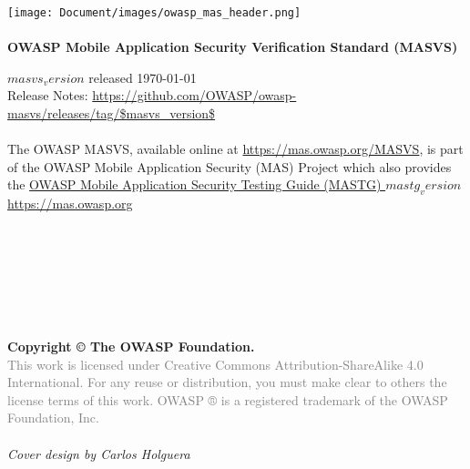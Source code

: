 \thispagestyle{empty} %

\texttt{[image: Document/images/owasp\_mas\_header.png]} \\ \\

\large{\textbf{OWASP Mobile Application Security Verification Standard (MASVS)} }

$masvs_version$ released \today \\

Release Notes: \url{https://github.com/OWASP/owasp-masvs/releases/tag/$masvs_version$} \\ \\


The OWASP MASVS, available online at \url{https://mas.owasp.org/MASVS}, is part of the OWASP Mobile Application Security (MAS) Project which also provides the \href{https://mas.owasp.org/MASTG}{OWASP Mobile Application Security Testing Guide (MASTG) $mastg_version$} \\

\url{https://mas.owasp.org} \\ \\ \\ \\ \\ \\ \\ \\

\textbf{Copyright © The OWASP Foundation.} \\

\footnotesize{\textcolor{gray}{This work is licensed under Creative Commons Attribution-ShareAlike 4.0 International. For any reuse or distribution, you must make clear to others the license terms of this work.
OWASP ® is a registered trademark of the OWASP Foundation, Inc.} }\\ \\


\emph{Cover design by Carlos Holguera}